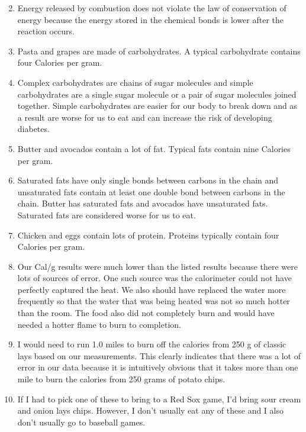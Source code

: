 \documentclass[12pt]{article}
\begin{document}
    \begin{enumerate}
        \setcounter{enumi}{1}
        \item Energy released by combustion does not violate the law of conservation of energy because the energy stored in the chemical bonds is lower after the reaction occurs.
        \item Pasta and grapes are made of carbohydrates. A typical carbohydrate contains four Calories per gram.
        \item Complex carbohydrates are chains of sugar molecules and simple carbohydrates are a single sugar molecule or a pair of sugar molecules joined together. Simple carbohydrates are easier for our body to break down and as a result are worse for us to eat and can increase the risk of developing diabetes.
        \item Butter and avocados contain a lot of fat. Typical fats contain nine Calories per gram.
        \item Saturated fats have only single bonds between carbons in the chain and unsaturated fats contain at least one double bond between carbons in the chain. Butter has saturated fats and avocados have unsaturated fats. Saturated fats are considered worse for us to eat.
        \item Chicken and eggs contain lots of protein. Proteins typically contain four Calories per gram. 
        \item Our Cal/g results were much lower than the listed results because there were lots of sources of error. One such source was the calorimeter could not have perfectly captured the heat. We also should have replaced the water more frequently so that the water that was being heated was not so much hotter than the room. The food also did not completely burn and would have needed a hotter flame to burn to completion.
        \item I would need to run 1.0 miles to burn off the calories from 250 g of classic lays based on our measurements. This clearly indicates that there was a lot of error in our data because it is intuitively obvious that it takes more than one mile to burn the calories from 250 grams of potato chips.
        \item If I had to pick one of these to bring to a Red Sox game, I'd bring sour cream and onion lays chips. However, I don't usually eat any of these and I also don't usually go to baseball games.
    \end{enumerate}
\end{document}
